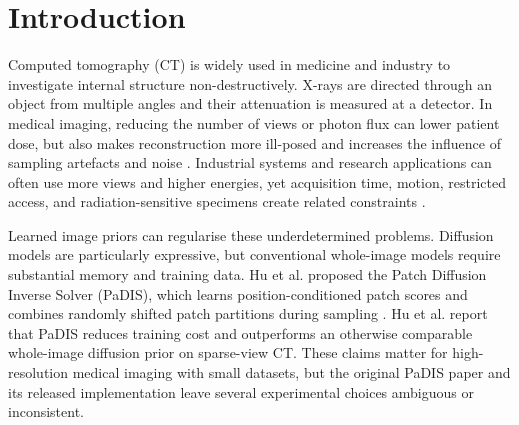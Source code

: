 
\ifpdf
    \graphicspath{{Chapter1/Figs/Raster/}{Chapter1/Figs/PDF/}{Chapter1/Figs/}}
\else
    \graphicspath{{Chapter1/Figs/Vector/}{Chapter1/Figs/}}
\fi


\chapter{Introduction}

Computed tomography (CT) is widely used in medicine and industry to investigate
internal structure non-destructively. X-rays are directed through an object from
multiple angles and their attenuation is measured at a detector. In medical
imaging, reducing the number of views or photon flux can lower patient dose, but
also makes reconstruction more ill-posed and increases the influence of sampling
artefacts and noise \cite{sidky_accurate_2006, chang_modeling_2017}. Industrial
systems and research applications can often use more views and higher energies,
yet acquisition time, motion, restricted access, and radiation-sensitive
specimens create related constraints \cite{sun_realisation_2023}.

Learned image priors can regularise these underdetermined problems. Diffusion models are particularly expressive, but conventional whole-image models require substantial memory and training data. Hu et al. proposed the Patch Diffusion Inverse Solver (PaDIS), which learns position-conditioned patch scores and combines randomly shifted patch partitions during sampling \cite{hu_learning_2024}. Hu et al. report that PaDIS reduces training cost and outperforms an otherwise comparable whole-image diffusion prior on sparse-view CT. These claims matter for high-resolution medical imaging with small datasets, but the original PaDIS paper and its released implementation leave several experimental choices ambiguous or inconsistent.

